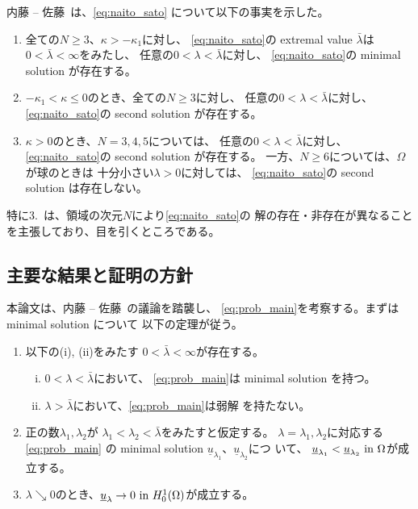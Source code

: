 内藤 -- 佐藤~\cite{MR2886160}は、\eqref{eq:naito_sato}
について以下の事実を示した。
\begin{enumerate}[1.] \sage
 \item 全ての$N \geq 3$、$\kappa > - \kappa_1$に対し、
       \eqref{eq:naito_sato}の extremal value $\bar{\lambda}$は
       $0 < \bar{\lambda} < \infty$をみたし、
       任意の$0 < \lambda < \bar{\lambda}$に対し、
       \eqref{eq:naito_sato}の minimal solution が存在する。
 \item $-\kappa_1 < \kappa \leq 0$のとき、全ての$N \geq 3$に対し、
       任意の$0 < \lambda < \bar{\lambda}$に対し、
       \eqref{eq:naito_sato}の second solution が存在する。
 \item $\kappa > 0$のとき、$N = 3, 4, 5$については、
       任意の$0 < \lambda < \bar{\lambda}$に対し、
       \eqref{eq:naito_sato}の second solution が存在する。
       一方、$N \geq 6$については、$\Omega$が球のときは
       十分小さい$\lambda > 0$に対しては、
       \eqref{eq:naito_sato}の second solution は存在しない。
\end{enumerate}
特に3.~は、領域の次元$N$により\eqref{eq:naito_sato}の
解の存在・非存在が異なることを主張しており、目を引くところである。

\subsection{主要な結果と証明の方針}

本論文は、内藤 -- 佐藤~\cite{MR2886160}の議論を踏襲し、
\ref{eq:prob_main}を考察する。まずは minimal solution について
以下の定理が従う。

\begin{thm} \label{thm:minimal_solution}
 \begin{enumerate}[1.] \sage
  \item 以下の(i), (ii)をみたす
        $0 < \bar{\lambda} < \infty$が存在する。
        \begin{enumerate}[(i)]
         \item $0 < \lambda < \bar{\lambda}$において、
               \ref{eq:prob_main}は minimal solution を持つ。
         \item $\lambda > \bar{\lambda}$において、\ref{eq:prob_main}は弱解
                を持たない。
        \end{enumerate}
  \item 正の数$\lambda_1, \lambda_2$が
        $\lambda_1 < \lambda_2 < \bar{\lambda}$をみたすと仮定する。
        $\lambda = \lambda_1, \lambda_2$に対応する\ref{eq:prob_main}
        の minimal solution
        $\underline{u}_{\lambda_1}$、$\underline{u}_{\lambda_2}$につ
        いて、
        $\underline{u}_{\lambda_1} < \underline{u}_{\lambda_2} ~\text{in}~
        \Omega$が成立する。
  \item $\lambda \searrow 0$のとき、$\underline{u}_\lambda \to 0 ~
        \text{in}~ H_0^1(\Omega)$が成立する。 
 \end{enumerate}
\end{thm}

